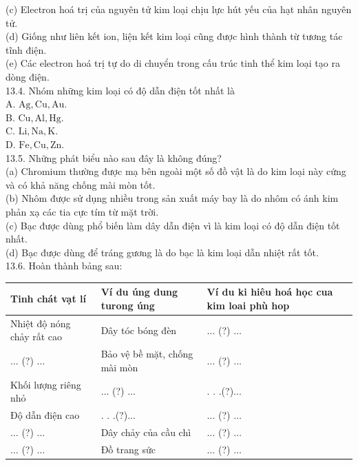 \documentclass[10pt]{article}
\begin{document}
(c) Electron hoá trị của nguyên tử kim loại chịu lực hút yếu của hạt nhân nguyên tử.\\
(d) Giống như liên kết ion, liện kết kim loại cũng được hình thành từ tương tác tĩnh điện.\\
(e) Các electron hoá trị tự do di chuyển trong cấu trúc tinh thể kim loại tạo ra dòng điện.\\
13.4. Nhóm những kim loại có độ dẫn điện tốt nhất là\\
A. $\mathrm{Ag}, \mathrm{Cu}, \mathrm{Au}$.\\
B. $\mathrm{Cu}, \mathrm{Al}, \mathrm{Hg}$.\\
C. $\mathrm{Li}, \mathrm{Na}, \mathrm{K}$.\\
D. $\mathrm{Fe}, \mathrm{Cu}, \mathrm{Zn}$.\\
13.5. Những phát biểu nào sau đây là không đúng?\\
(a) Chromium thường được mạ bên ngoài một số đồ vật là do kim loại này cứng và có khả năng chống mài mòn tốt.\\
(b) Nhôm được sử dụng nhiều trong sản xuất máy bay là do nhôm có ánh kim phản xạ các tia cực tím từ mặt trời.\\
(c) Bạc được dùng phổ biến làm dây dẫn điện vì là kim loại có độ dẫn điện tốt nhất.\\
(d) Bạc được dùng để tráng gương là do bạc là kim loại dẫn nhiệt rất tốt.\\
13.6. Hoàn thành bảng sau:

\begin{center}
\begin{tabular}{|l|l|l|}
\hline
Tinh chát vạt lí & Ví du úng dung turong úng & Ví du ki hiêu hoá học cua kim loai phù hop \\
\hline
Nhiệt độ nóng chảy rất cao & Dây tóc bóng đèn & $\ldots$ (?) $\ldots$ \\
\hline
$\ldots$ (?) $\ldots$ & Bảo vệ bề mặt, chống mài mòn & $\ldots$ (?) $\ldots$ \\
\hline
Khối lượng riêng nhỏ & $\ldots$ (?) $\ldots$ & . . .(?)... \\
\hline
Độ dẫn điện cao & . . .(?)... & $\ldots$ (?) $\ldots$ \\
\hline
$\ldots$ (?) $\ldots$ & Dây chảy của cầu chì & $\ldots$ (?) $\ldots$ \\
\hline
$\ldots$ (?) $\ldots$ & Đồ trang sức & $\ldots$ (?) $\ldots$ \\
\hline
\end{tabular}
\end{center}
\end{document}
